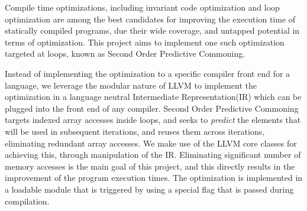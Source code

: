 Compile time optimizations, including invariant code optimization and loop optimization are among the best candidates for improving the execution time of statically compiled programs, due their wide coverage, and untapped potential in terms of optimization. This project aims to implement one such optimization targeted at loops, known as Second Order Predictive Commoning.

Instead of implementing the optimization to a specific compiler front end for a language, we leverage the modular nature of LLVM to implement the optimization in a language neutral Intermediate Representation(IR) which can be plugged into the front end of any compiler. Second Order Predictive Commoning targets indexed array accesses inside loops, and seeks to \textsl{predict} the elements that will be used in subsequent iterations, and reuses them across iterations, eliminating redundant array accesses. We make use of the LLVM core classes for achieving this, through manipulation of the IR. Eliminating significant number of memory accesses is the main goal of this project, and this directly results in the improvement of the program execution times. The optimization is implemented in a loadable module that is triggered by using a special flag that is passed during compilation.

